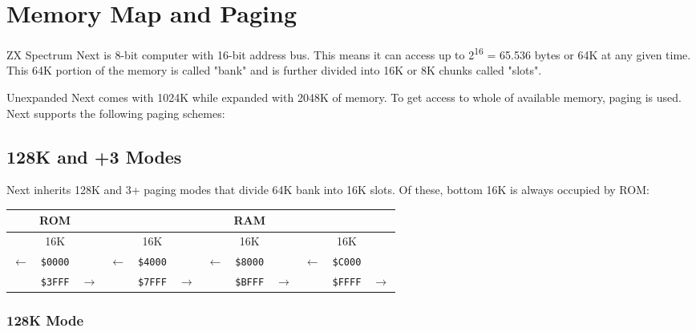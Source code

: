 \documentclass[twoside,openright,a4paper]{book}
\newcommand{\notet}{\rule{0pt}{2.4ex}}
\newcommand{\noteb}{\rule[-1.3ex]{0pt}{0pt}}
\begin{document}
\pagebreak
\section{Memory Map and Paging}
\label{zx_next_memorypaging}

\newcommand{\colnoline}[1]{\multicolumn{1}{c}{#1}}

ZX Spectrum Next is 8-bit computer with 16-bit address bus. This means it can access up to 2\textsuperscript{16} = 65.536 bytes or 64K at any given time. This 64K portion of the memory is called "bank" and is further divided into 16K or 8K chunks called "slots".

Unexpanded Next comes with 1024K while expanded with 2048K of memory. To get access to whole of available memory, paging is used. Next supports the following paging schemes:

\subsection{128K and +3 Modes}

Next inherits 128K and 3+ paging modes that divide 64K bank into 16K slots. Of these, bottom 16K is always occupied by ROM:

\begingroup
	\setlength{\tabcolsep}{1pt}
	\begin{tabular}{|ccc|ccc|ccc|ccc|}
		\hline
		\multicolumn{3}{|c}{ROM}\notet\noteb &
			\multicolumn{9}{|c|}{RAM} \\
		\hline
		\multicolumn{3}{|c}{16K}\notet\noteb &
			\multicolumn{3}{|c}{16K} &
			\multicolumn{3}{|c}{16K} &
			\multicolumn{3}{|c|}{16K} \\
		\hline
		\colnoline{$\leftarrow$}\notet & \colnoline{\tt \$0000} & \colnoline{} &
			\colnoline{$\leftarrow$} & \colnoline{\tt \$4000} & \colnoline{} &
			\colnoline{$\leftarrow$} & \colnoline{\tt \$8000} & \colnoline{} &
			\colnoline{$\leftarrow$} & \colnoline{\tt \$C000} & \colnoline{} \\
		\colnoline{} & \colnoline{\tt \$3FFF} & \colnoline{$\rightarrow$} &
			\colnoline{} & \colnoline{\tt \$7FFF} & \colnoline{$\rightarrow$} &
			\colnoline{} & \colnoline{\tt \$BFFF} & \colnoline{$\rightarrow$} &
			\colnoline{} & \colnoline{\tt \$FFFF} & \colnoline{$\rightarrow$} \\
	\end{tabular}
\endgroup

\subsubsection{128K Mode}
\end{document}
